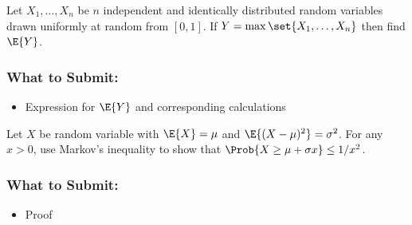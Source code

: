 \documentclass{article}
\begin{document}
\begin{bprob}
     Let $X_1,\dots,X_n$ be $n$ independent and identically distributed random variables drawn uniformly at random from $[0,1]$. If $Y = \max\set{X_1,\ldots,X_n}$ then find $\E{Y}$.
    \subsubsection*{What to Submit:}
    \begin{itemize}
        \item Expression for $\E{Y}$ and corresponding calculations
    \end{itemize}
\end{bprob}

\begin{bprob}
     Let $X$ be random variable with $\E{X} = \mu$ and $\E{(X-\mu)^2} = \sigma^2$. For any $x > 0$, use Markov's inequality to show that $\Prob{ X \geq \mu + \sigma x } \leq 1/x^2$.
    \subsubsection*{What to Submit:}
    \begin{itemize}
        \item Proof
    \end{itemize}
\end{bprob}
\end{document}
